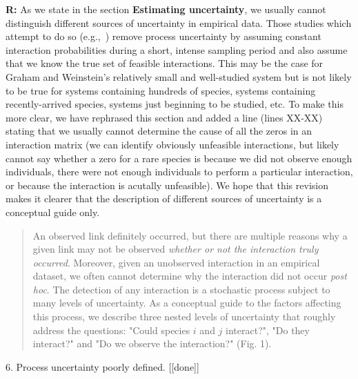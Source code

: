 \documentclass[12pt]{letter}
\begin{document}
		\textbf{R:} As we state in the section \textbf{Estimating uncertainty}, we usually cannot distinguish different sources of uncertainty in empirical data. Those studies which attempt to do so (e.g.,~\citet{Graham2018}) remove process uncertainty by assuming constant interaction probabilities during a short, intense sampling period and also assume that we know the true set of feasible interactions. This may be the case for Graham and Weinstein's relatively small and well-studied system but is not likely to be true for systems containing hundreds of species, systems containing recently-arrived species, systems just beginning to be studied, etc.
		\smallskip
		To make this more clear, we have rephrased this section and added a line (lines XX-XX) stating that we usually cannot determine the cause of all the zeros in an interaction matrix (we can identify obviously unfeasible interactions, but likely cannot say whether a zero for a rare species is because we did not observe enough individuals, there were not enough individuals to perform a particular interaction, or because the interaction is acutally unfeasible). We hope that this revision makes it clearer that the description of different sources of uncertainty is a conceptual guide only.


		\begin{quotation}
			An observed link definitely occurred, but there are multiple reasons why a given link may not be observed \emph{whether or not the interaction truly occurred}. Moreover, given an unobserved interaction in an empirical dataset, we often cannot determine why the interaction did not occur \emph{post hoc}. The detection of any interaction is a stochastic process subject to many levels of uncertainty. As a conceptual guide to the factors affecting this process, we describe three nested levels of uncertainty that roughly address the questions: "Could species $i$ and $j$ interact?", "Do they interact?" and "Do we observe the interaction?" (Fig. 1). 
		\end{quotation}


	6. Process uncertainty poorly defined. [[done]]
\end{document}
